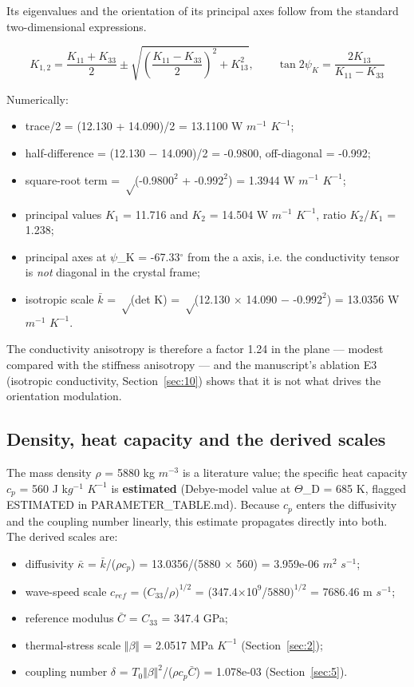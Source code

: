 \documentclass[preprint,12pt]{elsarticle}
\begin{document}
Its eigenvalues and the orientation of its principal axes follow from the standard two-dimensional expressions.

\begin{equation}
K_{1,2}=\frac{K_{11}+K_{33}}{2}\pm\sqrt{\left(\frac{K_{11}-K_{33}}{2}\right)^2+K_{13}^2},\qquad \tan 2\psi_K=\frac{2K_{13}}{K_{11}-K_{33}} 
\label{eq:1}
\end{equation}

Numerically:

\begin{itemize}
\item trace/2 = (12.130 + 14.090)/2 = 13.1100 W $m^{-1}$ $K^{-1}$;
\item half-difference = (12.130 $-$ 14.090)/2 = -0.9800, off-diagonal = -0.992;
\item square-root term = $\sqrt$(-0.980$0^{2}$ + -0.99$2^{2}$) = 1.3944 W $m^{-1}$ $K^{-1}$;
\item principal values $K_{1}$ = 11.716 and $K_{2}$ = 14.504 W $m^{-1}$ $K^{-1}$, ratio $K_{2}$/$K_{1}$ = 1.238;
\item principal axes at $\psi$\_K = -67.33$^{\circ}$ from the a axis, i.e. the conductivity tensor is \emph{not} diagonal in the crystal frame;
\item isotropic scale $\bar{k}$ = $\sqrt$(det K) = $\sqrt$(12.130 $\times$ 14.090 $-$ -0.99$2^{2}$) = 13.0356 W $m^{-1}$ $K^{-1}$.
\end{itemize}

The conductivity anisotropy is therefore a factor 1.24 in the plane --- modest compared with the stiffness anisotropy --- and the manuscript's ablation E3 (isotropic conductivity, Section~\ref{sec:10}) shows that it is not what drives the orientation modulation.

\subsection{Density, heat capacity and the derived scales}
\label{sec:1.5}

The mass density $\rho$ = 5880 kg $m^{-3}$ is a literature value; the specific heat capacity $c_{p}$ = 560 J k$g^{-1}$ $K^{-1}$ is \textbf{estimated} (Debye-model value at $\Theta$\_D = 685 K, flagged ESTIMATED in PARAMETER\_TABLE.md). Because $c_{p}$ enters the diffusivity and the coupling number linearly, this estimate propagates directly into both. The derived scales are:

\begin{itemize}
\item diffusivity $\bar{\kappa}$ = $\bar{k}$/($\rho c_{p}$) = 13.0356/(5880 $\times$ 560) = 3.959e-06 $m^{2}$ $s^{-1}$;
\item wave-speed scale $c_{ref}$ = ($C_{33}$/$\rho)^{1/2}$ = (347.4$\times$1$0^{9}$/$5880)^{1/2}$ = 7686.46 m $s^{-1}$;
\item reference modulus $\bar{C}$ = $C_{33}$ = 347.4 GPa;
\item thermal-stress scale $\Vert \beta \Vert$ = 2.0517 MPa $K^{-1}$ (Section~\ref{sec:2});
\item coupling number $\delta$ = $T_{0}\Vert \beta \Vert ^{2}$/($\rho c_{p}\bar{C}$) = 1.078e-03 (Section~\ref{sec:5}).
\end{itemize}
\end{document}
